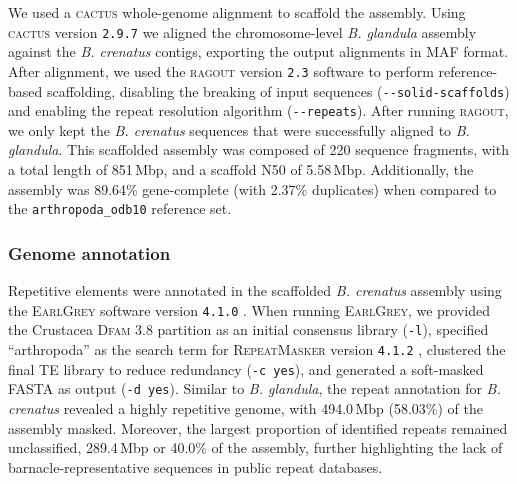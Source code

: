 We used a \textsc{cactus} whole-genome alignment \citep{armstrong_progressive_2020} to
scaffold the assembly.
Using \textsc{cactus} version \texttt{2.9.7} we aligned the chromosome-level
\textit{B. glandula} assembly against the \textit{B. crenatus} contigs,
exporting the output alignments in MAF format.
After alignment, we used the \textsc{ragout} version \texttt{2.3} software
\citep{kolmogorov_ragout_2018} to perform reference-based scaffolding, disabling
the breaking of input sequences (\texttt{-{}-solid-scaffolds}) and enabling the
repeat resolution algorithm (\texttt{-{}-repeats}).
After running \textsc{ragout}, we only kept the \textit{B. crenatus} sequences that
were successfully aligned to \textit{B. glandula}.
This scaffolded assembly was composed of 220 sequence fragments, with a total length
of 851\,Mbp, and a scaffold N50 of 5.58\,Mbp.
Additionally, the assembly was 89.64\% gene-complete (with 2.37\% duplicates) when
compared to the \texttt{arthropoda\_odb10} reference set.

\subsubsection*{Genome annotation}

Repetitive elements were annotated in the scaffolded \textit{B. crenatus} assembly
using the \textsc{EarlGrey} software version \texttt{4.1.0} \citep{baril_earl_2024}.
When running \textsc{EarlGrey}, we provided the Crustacea \textsc{Dfam 3.8} partition
as an initial consensus library (\texttt{-l}), specified ``arthropoda'' as the
search term for \textsc{RepeatMasker} version \texttt{4.1.2}
\citep{smit_repeatmasker_2013}, clustered the final TE library to reduce redundancy
(\texttt{-c yes}), and generated a soft-masked FASTA as output (\texttt{-d yes}).
Similar to \textit{B. glandula}, the repeat annotation for \textit{B. crenatus}
revealed a highly repetitive genome, with 494.0\,Mbp (58.03\%) of the assembly
masked.
Moreover, the largest proportion of identified repeats remained unclassified,
289.4\,Mbp or 40.0\% of the assembly, further highlighting the lack of
barnacle-representative sequences in public repeat databases.
\vspace{0.1cm}


